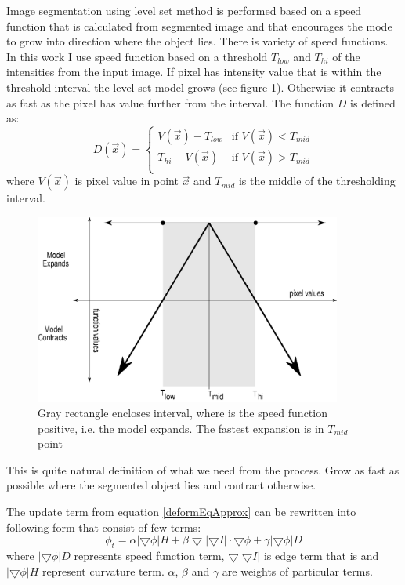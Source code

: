 Image segmentation using level set method is performed based on a speed function that is calculated from segmented image and that encourages the mode to grow into direction where the object lies.
There is variety of speed functions.
In this work I use speed function based on a threshold $T_{low}$ and $T_{hi}$ of the intensities from the input image.
If pixel has intensity value that is within the threshold interval the level set model grows (see figure \ref{fg:speedFunction}).
Otherwise it contracts as fast as the pixel has value further from the interval.
The function $D$ is defined as:
\begin{equation}
\label{eq:speedFunction}
D(\vec{x}) =
\begin{cases}
V(\vec{x}) - T_{low} & \text{if $V(\vec{x}) < T_{mid}$}\\
T_{hi} - V(\vec{x}) & \text{if $V(\vec{x}) > T_{mid}$}\\
\end{cases}
\end{equation}
where $V(\vec{x})$ is pixel value in point $\vec{x}$ and $T_{mid}$ is the middle of the thresholding interval.

\begin{figure}
    \centering
    \includegraphics[width=0.9\textwidth]{data/speedFunction}
    \caption[Graph of thresholding based speed function]
    {
      Gray rectangle encloses interval, where is the speed function positive, i.e. the model expands.
      The fastest expansion is in $T_{mid}$ point
    }
    \label{fg:speedFunction}
\end{figure}

This is quite natural definition of what we need from the process.
Grow as fast as possible where the segmented object lies and contract otherwise.

The update term from equation \ref{deformEqApprox} can be rewritten into following form that consist of few terms:
\begin{equation}
\phi_t = \alpha |\bigtriangledown \phi| H + \beta
\bigtriangledown|\bigtriangledown I|\cdot \bigtriangledown \phi +
\gamma|\bigtriangledown \phi|D
\end{equation}
where $|\bigtriangledown \phi|D$ represents speed function term, $\bigtriangledown|\bigtriangledown I|$ is edge term that is and $|\bigtriangledown \phi| H$ represent curvature term. $\alpha$, $\beta$ and $\gamma$ are weights of particular terms.

